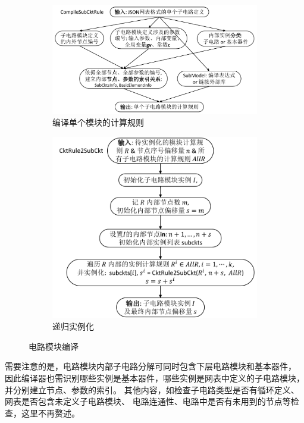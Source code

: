 \begin{figure}[htpb]
  \centering
  \begin{subfigure}{0.59\textwidth}
    \includegraphics[width = \textwidth]{fig/compile-subckt-rule.pdf}
    \caption{编译单个模块的计算规则}
    \label{fig:compile-subckt-rule}
  \end{subfigure}
  \begin{subfigure}{0.35\textwidth}
    \includegraphics[width = \textwidth]{fig/cktrule-to-subckt.pdf}
    \caption{递归实例化}
    \label{fig:cktrule-to-subckt}
  \end{subfigure}
  \caption{电路模块编译}
  \label{fig:subckt-module-compilation}
\end{figure}
需要注意的是，电路模块内部子电路分解可同时包含下层电路模块和基本器件，
因此编译器也需识别哪些实例是基本器件，哪些实例是网表中定义的子电路模块，
并分别建立节点、参数的索引。
其他内容，如检查子电路类型是否有循环定义、网表是否包含未定义子电路模块、
电路连通性、电路中是否有未用到的节点等检查，这里不再赘述。
